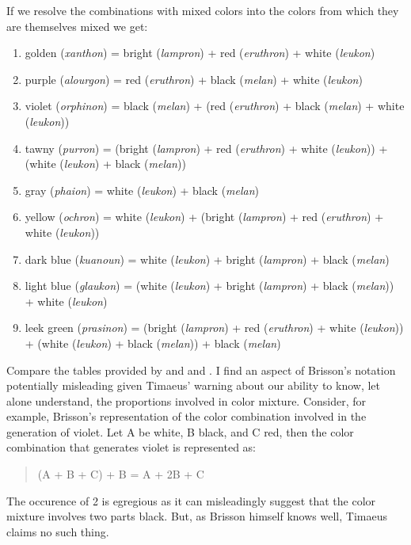 If we resolve the combinations with mixed colors into the colors from which they are themselves mixed we get:
\begin{enumerate}
	\item golden (\emph{xanthon}) = bright (\emph{lampron}) + red (\emph{eruthron}) + white (\emph{leukon})
	\item purple (\emph{alourgon}) = red (\emph{eruthron}) + black (\emph{melan}) + white (\emph{leukon})
	\item violet (\emph{orphinon}) = black (\emph{melan}) + (red (\emph{eruthron}) + black (\emph{melan}) + white (\emph{leukon}))
	\item tawny (\emph{purron}) = (bright (\emph{lampron}) + red (\emph{eruthron}) + white (\emph{leukon})) + (white (\emph{leukon}) + black (\emph{melan}))
	\item gray (\emph{phaion}) = white (\emph{leukon}) + black (\emph{melan})
	\item yellow (\emph{ochron}) = white (\emph{leukon}) + (bright (\emph{lampron}) + red (\emph{eruthron}) + white (\emph{leukon}))
	\item dark blue (\emph{kuanoun}) = white (\emph{leukon}) + bright (\emph{lampron}) + black (\emph{melan})
	\item light blue (\emph{glaukon}) = (white (\emph{leukon}) + bright (\emph{lampron}) + black (\emph{melan})) + white (\emph{leukon})
	\item leek green (\emph{prasinon}) = (bright (\emph{lampron}) + red (\emph{eruthron}) + white (\emph{leukon})) + (white (\emph{leukon}) + black (\emph{melan})) + black (\emph{melan})
\end{enumerate}
Compare the tables provided by \citealt[56-7]{James:1996pb} and \citealt[175]{Brisson:1997qr} and \citealt[466-7, 600]{Brisson:1998aa}. I find an aspect of Brisson's notation potentially misleading given Tim\-ae\-us' warning about our ability to know, let alone understand, the proportions involved in color mixture. Consider, for example, Brisson's representation of the color combination involved in the generation of violet. Let A be white, B black, and C red, then the color combination that generates violet is represented as:
\begin{quote}
	(A + B + C) + B = A + 2B + C
\end{quote}
The occurence of 2 is egregious as it can misleadingly suggest that the color mixture involves two parts black. But, as Brisson himself knows well, Timaeus claims no such thing.

